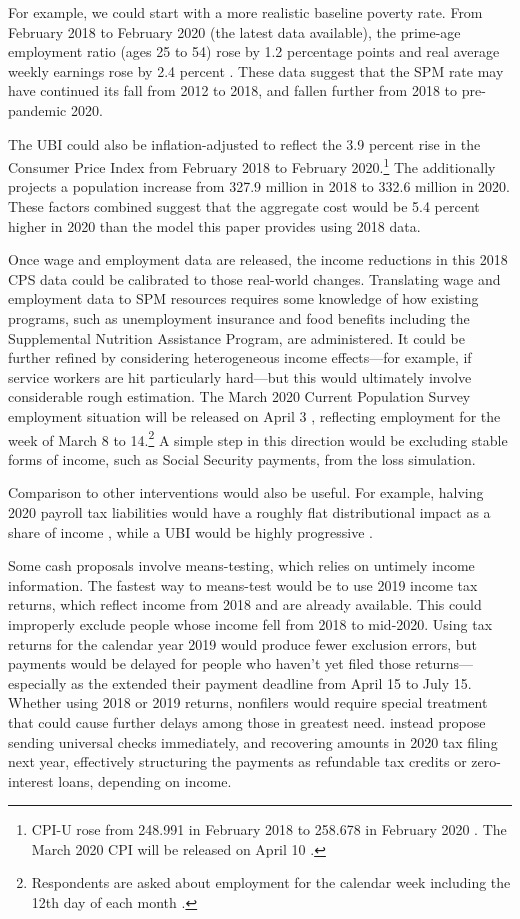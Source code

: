 \documentclass[12pt]{article}
\begin{document}
For example, we could start with a more realistic baseline poverty rate. From February 2018 to February 2020 (the latest data available), the prime-age employment ratio (ages 25 to 54) rose by 1.2 percentage points \cite{fred_paepop} and real average weekly earnings rose by 2.4 percent \cite{bls_earnings}. These data suggest that the SPM rate may have continued its fall from 2012 to 2018, and fallen further from 2018 to pre-pandemic 2020.

The UBI could also be inflation-adjusted to reflect the 3.9 percent rise in the Consumer Price Index from February 2018 to February 2020.\footnote{CPI-U rose from 248.991 in February 2018 to 258.678 in February 2020 \cite{bls_cpi_data}. The March 2020 CPI will be released on April 10 \cite{bls_cpi_releases}.} The  additionally projects a population increase from 327.9 million in 2018 to 332.6 million in 2020. These factors combined suggest that the aggregate cost would be 5.4 percent higher in 2020 than the model this paper provides using 2018 data.

Once wage and employment data are released, the income reductions in this 2018 CPS data could be calibrated to those real-world changes. Translating wage and employment data to SPM resources requires some knowledge of how existing programs, such as unemployment insurance and food benefits including the Supplemental Nutrition Assistance Program, are administered. It could be further refined by considering heterogeneous income effects---for example, if service workers are hit particularly hard---but this would ultimately involve considerable rough estimation. The March 2020 Current Population Survey employment situation will be released on April 3 \cite{bls_releases}, reflecting employment for the week of March 8 to 14.\footnote{Respondents are asked about employment for the calendar week including the 12th day of each month \cite{bls_cps_faq}.} A simple step in this direction would be excluding stable forms of income, such as Social Security payments, from the loss simulation.

Comparison to other interventions would also be useful. For example, halving 2020 payroll tax liabilities would have a roughly flat distributional impact as a share of income \cite{taxbrain}, while a UBI would be highly progressive \cite{ghenis_yang}.

Some cash proposals involve means-testing, which relies on untimely income information. The fastest way to means-test would be to use 2019 income tax returns, which reflect income from 2018 and are already available. This could improperly exclude people whose income fell from 2018 to mid-2020. Using tax returns for the calendar year 2019 would produce fewer exclusion errors, but payments would be delayed for people who haven't yet filed those returns---especially as the  extended their payment deadline from April 15 to July 15. Whether using 2018 or 2019 returns, nonfilers would require special treatment that could cause further delays among those in greatest need.  instead propose sending universal checks immediately, and recovering amounts in 2020 tax filing next year, effectively structuring the payments as refundable tax credits or zero-interest loans, depending on income.
\end{document}
